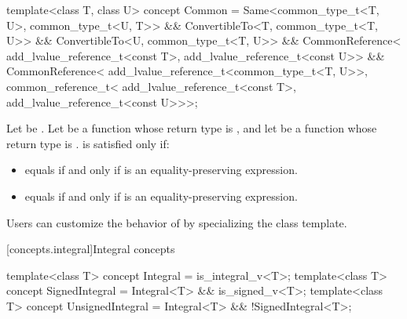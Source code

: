 %
\begin{itemdecl}
template<class T, class U>
  concept Common =
    Same<common_type_t<T, U>, common_type_t<U, T>> &&
    ConvertibleTo<T, common_type_t<T, U>> &&
    ConvertibleTo<U, common_type_t<T, U>> &&
    CommonReference<
      add_lvalue_reference_t<const T>,
      add_lvalue_reference_t<const U>> &&
    CommonReference<
      add_lvalue_reference_t<common_type_t<T, U>>,
      common_reference_t<
        add_lvalue_reference_t<const T>,
        add_lvalue_reference_t<const U>>>;
\end{itemdecl}

\begin{itemdescr}
\pnum
Let  be . Let
 be a function whose return type is , and let  be a
function whose return type is .  is
satisfied only if:
\begin{itemize}
\item {} equals  if and only if
   is an equality-preserving
  expression.
\item {} equals  if and only if
   is an equality-preserving
  expression.
\end{itemize}

\pnum
\begin{note}
Users can customize the behavior of  by specializing the
 class template.
\end{note}

\end{itemdescr}

[concepts.integral]{Integral concepts}

%
%
%
\begin{itemdecl}
template<class T>
  concept Integral = is_integral_v<T>;
template<class T>
  concept SignedIntegral = Integral<T> && is_signed_v<T>;
template<class T>
  concept UnsignedIntegral = Integral<T> && !SignedIntegral<T>;
\end{itemdecl}

